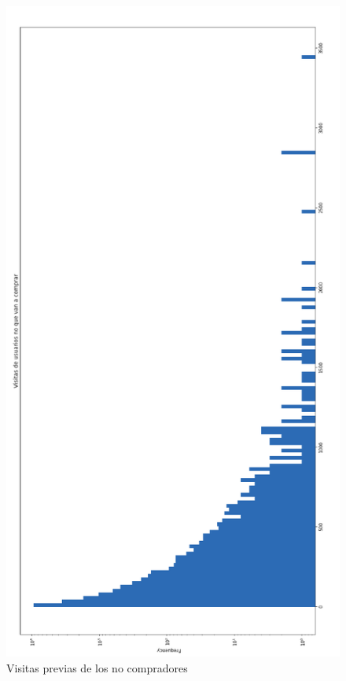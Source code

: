 \documentclass[a4paper ,12pt]{article}
\begin{document}
\begin{figure}[H]
\centering
\includegraphics[width=\linewidth ,  height=0.95\textheight ]{visitas_prev_no_compras}
\caption{Visitas previas de los no compradores}
\label{fig:visitas_prev_no_compras}
\end{figure}
\end{document}
